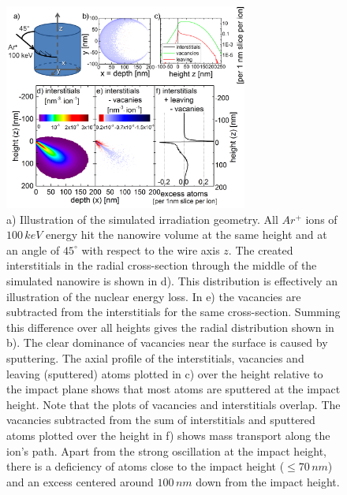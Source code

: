 \clearpage
\begin{figure}[thbp]
	\centering
		\includegraphics[width=8cm]{images/deformationBCA.jpg}
		\caption{a) Illustration of the simulated irradiation geometry. All $Ar^+$ ions of $100\,keV$ energy hit the nanowire volume at the same height and at an angle of $45^\circ$ with respect to the wire axis $z$. The created interstitials in the radial cross-section through the middle of the simulated nanowire is shown in d). This distribution is effectively an illustration of the nuclear energy loss. In e) the vacancies are subtracted from the interstitials for the same cross-section. Summing this difference over all heights gives the radial distribution shown in b). The clear dominance of vacancies near the surface is caused by sputtering. The axial profile of the interstitials, vacancies and leaving (sputtered) atoms plotted in c) over the height relative to the impact plane shows that most atoms are sputtered at the impact height. Note that the plots of vacancies and interstitials overlap. The vacancies subtracted from the sum of interstitials and sputtered atoms plotted over the height in f) shows mass transport along the ion's path. Apart from the strong oscillation at the impact height, there is a deficiency of atoms close to the impact height ($\le 70\,nm$) and an excess centered around $100\,nm$ down from the impact height.} 
	\label{deformationBCA}	
\end{figure}


